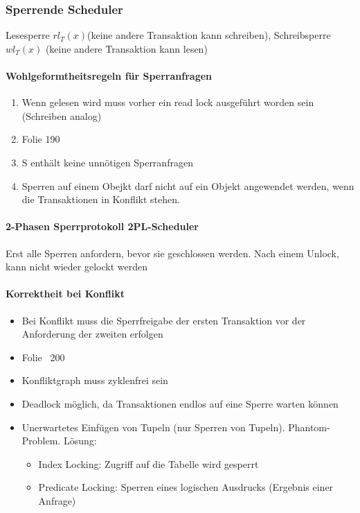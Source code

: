 \documentclass[ngerman]{scrartcl}
\begin{document}
\subsubsection{Sperrende Scheduler}
Lesesperre $ rl_T (x) $(keine andere Transaktion kann schreiben), Schreibsperre $ wl_T (x) $ (keine andere Transaktion kann lesen)

\paragraph{Wohlgeformtheitsregeln für Sperranfragen}
\begin{enumerate}
  \item Wenn gelesen wird muss vorher ein read lock ausgeführt worden sein (Schreiben analog)  
  \item Folie 190 
  \item S enthält keine unnötigen Sperranfragen
  \item Sperren auf einem Obejkt darf nicht auf ein Objekt angewendet werden, wenn die Transaktionen in Konflikt stehen.
\end{enumerate}

\paragraph{2-Phasen Sperrprotokoll 2PL-Scheduler} 
Erst alle Sperren anfordern, bevor sie geschlossen werden. Nach einem Unlock, kann nicht wieder gelockt werden 
\paragraph{Korrektheit bei Konflikt}
\begin{itemize}
  \item Bei Konflikt muss die Sperrfreigabe der ersten Transaktion vor der Anforderung der zweiten erfolgen
  \item Folie ~200
  \item Konfliktgraph muss zyklenfrei sein
  \item Deadlock möglich, da Transaktionen endlos auf eine Sperre warten können
  \item Unerwartetes Einfügen von Tupeln (nur Sperren von Tupeln). Phantom-Problem. Lösung:
  \begin{itemize}
    \item Index Locking: Zugriff auf die Tabelle wird gesperrt
    \item Predicate Locking: Sperren eines logischen Ausdrucks (Ergebnis einer Anfrage)
  \end{itemize}
\end{itemize}
\end{document}
